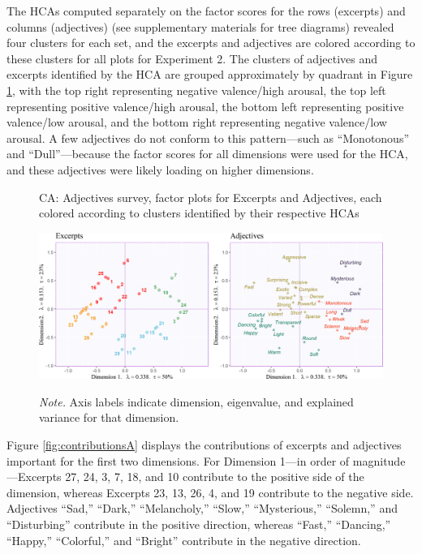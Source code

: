 \documentclass[
  english,
  man,floatsintext]{apa6}
\begin{document}
The HCAs computed separately on the factor scores for the rows (excerpts) and columns (adjectives) (see supplementary materials for tree diagrams) revealed four clusters for each set, and the excerpts and adjectives are colored according to these clusters for all plots for Experiment 2. The clusters of adjectives and excerpts identified by the HCA are grouped approximately by quadrant in Figure \ref{fig:factormapsA}, with the top right representing negative valence/high arousal, the top left representing positive valence/high arousal, the bottom left representing positive valence/low arousal, and the bottom right representing negative valence/low arousal. A few adjectives do not conform to this pattern---such as ``Monotonous'' and ``Dull''---because the factor scores for all dimensions were used for the HCA, and these adjectives were likely loading on higher dimensions.

\begin{figure}   
  \centering  
  \caption{CA: Adjectives survey, factor plots for Excerpts and Adjectives, each colored according to clusters identified by their respective HCAs}
    \includegraphics{./Music-Descriptor-Space_files/figure-latex/factormapsAcode-1.png}
  \label{fig:factormapsA}
  \caption*{\footnotesize \textit{Note.}  Axis labels indicate dimension, eigenvalue, and explained variance for that dimension.}
\end{figure}

Figure \ref{fig:contributionsA} displays the contributions of excerpts and adjectives important for the first two dimensions. For Dimension 1---in order of magnitude---Excerpts 27, 24, 3, 7, 18, and 10 contribute to the positive side of the dimension, whereas Excerpts 23, 13, 26, 4, and 19 contribute to the negative side. Adjectives ``Sad,'' ``Dark,'' ``Melancholy,'' ``Slow,'' ``Mysterious,'' ``Solemn,'' and ``Disturbing'' contribute in the positive direction, whereas ``Fast,'' ``Dancing,'' ``Happy,'' ``Colorful,'' and ``Bright'' contribute in the negative direction.
\end{document}
